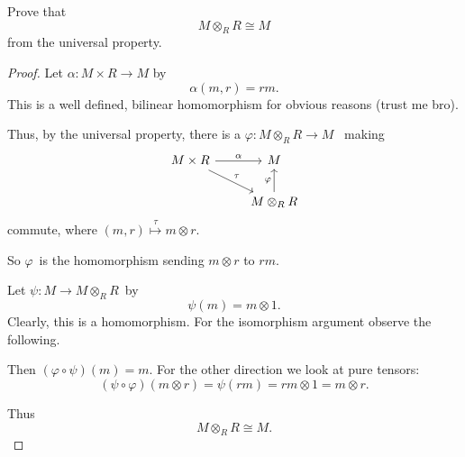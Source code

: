 \documentclass[11pt]{article}
\begin{document}
\begin{prob}
    Prove that 
    \[
        M \otimes_R R \cong M
    \]
    from the universal property. 
\end{prob}
\begin{proof}
    Let $\alpha : M \times R \to M$ by 
    \[
        \alpha(m,r) = rm. 
    \]
    This is a well defined, bilinear homomorphism for obvious 
    reasons (trust me bro). 

    Thus, by the universal property, there is a 
    $\varphi : M \otimes_R R \to M$ 
    making 
    \[
        \begin{tikzcd} 
            M \times R \arrow[dr, "\tau"] 
            \arrow[r, "\alpha"] & M \\ 
            & M \otimes_R R \arrow[u, "\varphi"]
        \end{tikzcd}
    \]
    commute, 
    where $(m,r) \overset\tau\mapsto m \otimes r$.

    So $\varphi$ is the homomorphism sending 
    $m \otimes r$ to $rm$. 

    Let $\psi : M \to M \otimes_R R$ by 
    \[
        \psi(m) = m \otimes 1. 
    \]
    Clearly, this is a homomorphism. 
    For the isomorphism argument observe the following. 

    Then $(\varphi \circ \psi)(m) = m$. 
    For the other direction we look at pure 
    tensors: 
    \[
        (\psi\circ \varphi)(m\otimes r) 
        = \psi(rm) = rm \otimes 1 = m\otimes r. 
    \]

    Thus 
    \[
        M \otimes_R R \cong M.
    \]
\end{proof}
\end{document}
